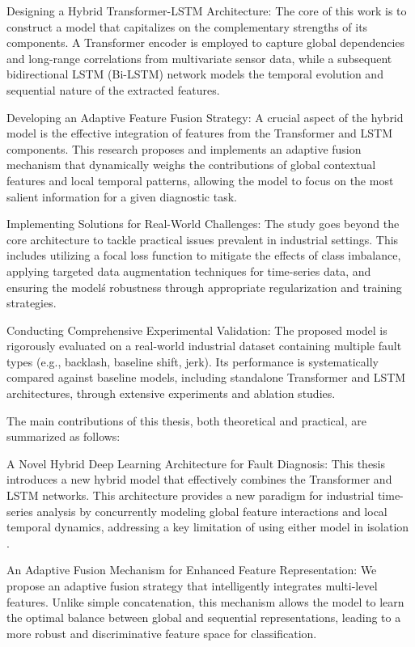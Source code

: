 Designing a Hybrid Transformer-LSTM Architecture: The core of this work is to construct a model that capitalizes on the complementary strengths of its components. A Transformer encoder is employed to capture global dependencies and long-range correlations from multivariate sensor data, while a subsequent bidirectional LSTM (Bi-LSTM) network models the temporal evolution and sequential nature of the extracted features.

Developing an Adaptive Feature Fusion Strategy: A crucial aspect of the hybrid model is the effective integration of features from the Transformer and LSTM components. This research proposes and implements an adaptive fusion mechanism that dynamically weighs the contributions of global contextual features and local temporal patterns, allowing the model to focus on the most salient information for a given diagnostic task.

Implementing Solutions for Real-World Challenges: The study goes beyond the core architecture to tackle practical issues prevalent in industrial settings. This includes utilizing a focal loss function to mitigate the effects of class imbalance, applying targeted data augmentation techniques for time-series data, and ensuring the model\'s robustness through appropriate regularization and training strategies.

Conducting Comprehensive Experimental Validation: The proposed model is rigorously evaluated on a real-world industrial dataset containing multiple fault types (e.g., backlash, baseline shift, jerk). Its performance is systematically compared against baseline models, including standalone Transformer and LSTM architectures, through extensive experiments and ablation studies.

The main contributions of this thesis, both theoretical and practical, are summarized as follows:

A Novel Hybrid Deep Learning Architecture for Fault Diagnosis: This thesis introduces a new hybrid model that effectively combines the Transformer and LSTM networks. This architecture provides a new paradigm for industrial time-series analysis by concurrently modeling global feature interactions and local temporal dynamics, addressing a key limitation of using either model in isolation \cite{wen2021time}.

An Adaptive Fusion Mechanism for Enhanced Feature Representation: We propose an adaptive fusion strategy that intelligently integrates multi-level features. Unlike simple concatenation, this mechanism allows the model to learn the optimal balance between global and sequential representations, leading to a more robust and discriminative feature space for classification.

